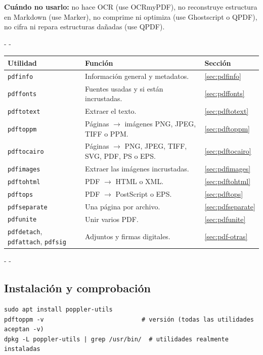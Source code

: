 \documentclass[11pt,a4paper]{article}
\makeatletter
\newcommand{\necesitaespacio}[1]{\par\penalty-100\begingroup
	\setlength{\dimen@}{#1}\dimen@ii\pagegoal\advance\dimen@ii-\pagetotal
	\ifdim\dimen@>\dimen@ii\ifdim\dimen@ii>\z@\vfil\fi\penalty-\@M\fi\endgroup}
\newcommand{\cmd}[1]{\texttt{\textcolor{colcmd}{#1}}}      %
\newcommand{\cab}[1]{\textbf{#1}}
\makeatother
\begin{document}
	\textbf{Cuándo no usarlo:} no hace OCR (use OCRmyPDF), no reconstruye estructura en Markdown (use Marker), no comprime ni optimiza (use Ghostscript o QPDF), no cifra ni repara estructuras dañadas (use QPDF).
	
	\begingroup\small
	\necesitaespacio{10\baselineskip}
	\begin{longtable}{L{3.0cm}L{8.16cm}C{2.0cm}}
		\toprule{}\cab{Utilidad} & \cab{Función} & \cab{Sección}\\\midrule
		\endfirsthead
		\bottomrule
		\endfoot
		\cmd{pdfinfo} & Información general y metadatos. & \ref{sec:pdfinfo}\\*
		\cmd{pdffonts} & Fuentes usadas y si están incrustadas. & \ref{sec:pdffonts}\\
		\cmd{pdftotext} & Extraer el texto. & \ref{sec:pdftotext}\\
		\cmd{pdftoppm} & Páginas $\rightarrow$ imágenes PNG, JPEG, TIFF o PPM. & \ref{sec:pdftoppm}\\
		\cmd{pdftocairo} & Páginas $\rightarrow$ PNG, JPEG, TIFF, SVG, PDF, PS o EPS. & \ref{sec:pdftocairo}\\
		\cmd{pdfimages} & Extraer las imágenes incrustadas. & \ref{sec:pdfimages}\\
		\cmd{pdftohtml} & PDF $\rightarrow$ HTML o XML. & \ref{sec:pdftohtml}\\
		\cmd{pdftops} & PDF $\rightarrow$ PostScript o EPS. & \ref{sec:pdftops}\\
		\cmd{pdfseparate} & Una página por archivo. & \ref{sec:pdfseparate}\\
		\cmd{pdfunite} & Unir varios PDF. & \ref{sec:pdfunite}\\*
		\cmd{pdfdetach}, \cmd{pdfattach}, \cmd{pdfsig} & Adjuntos y firmas digitales. & \ref{sec:pdf-otras}\\
	\end{longtable}
	\endgroup
	
	\necesitaespacio{8\baselineskip}
	\subsection{Instalación y comprobación}
	
	\begin{lstlisting}
sudo apt install poppler-utils
pdftoppm -v                           # versión (todas las utilidades aceptan -v)
dpkg -L poppler-utils | grep /usr/bin/  # utilidades realmente instaladas
\end{lstlisting}
	
\end{document}
